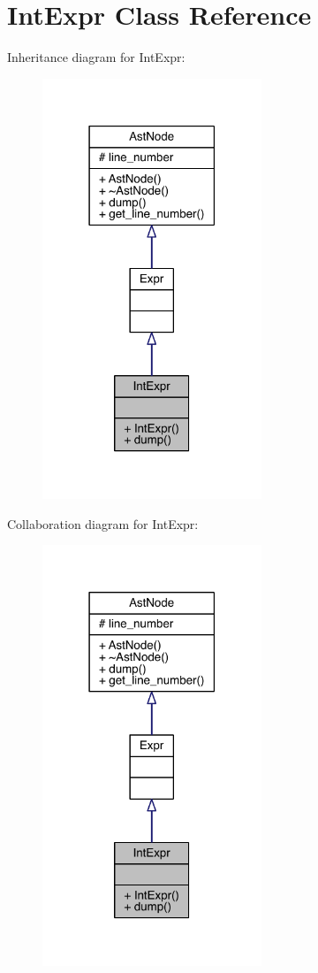 \hypertarget{class_int_expr}{}\section{Int\+Expr Class Reference}
\label{class_int_expr}


Inheritance diagram for Int\+Expr\+:\nopagebreak
\begin{figure}[H]
\begin{center}
\leavevmode
\includegraphics[width=186pt]{class_int_expr__inherit__graph}
\end{center}
\end{figure}


Collaboration diagram for Int\+Expr\+:\nopagebreak
\begin{figure}[H]
\begin{center}
\leavevmode
\includegraphics[width=186pt]{class_int_expr__coll__graph}
\end{center}
\end{figure}
